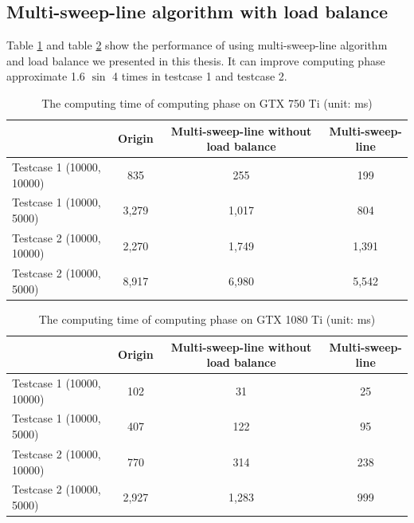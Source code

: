 \subsection{Multi-sweep-line algorithm with load balance}
Table \ref{table:5_13} and table \ref{table:5_14} show the performance of using multi-sweep-line algorithm and load balance we presented in this thesis. It can improve computing phase approximate 1.6 $\sin$ 4 times in testcase 1 and testcase 2.
\begin{table}[!h]
\centering
\begin{tabular}{| l | c | c | c |} 
 \hline
  & Origin  & Multi-sweep-line without load balance & Multi-sweep-line \\ [0.5ex] \hline
  Testcase 1 (10000, 10000) & 835 & 255 & 199\\ \hline
  Testcase 1 (10000, 5000) & 3,279 & 1,017 & 804\\ \hline
  Testcase 2 (10000, 10000) & 2,270 & 1,749 & 1,391\\ \hline
  Testcase 2 (10000, 5000) & 8,917 & 6,980 & 5,542\\ \hline
\end{tabular}
\caption{The computing time of computing phase on GTX 750 Ti (unit: ms)}
\label{table:5_13}
\end{table}

\begin{table}[!h]
\centering
\begin{tabular}{| l | c | c | c |} 
 \hline
  & Origin  & Multi-sweep-line without load balance & Multi-sweep-line \\ [0.5ex] \hline
  Testcase 1 (10000, 10000) & 102 & 31 & 25\\ \hline
  Testcase 1 (10000, 5000) & 407 & 122 & 95\\ \hline
  Testcase 2 (10000, 10000) & 770 & 314 & 238\\ \hline
  Testcase 2 (10000, 5000) & 2,927 & 1,283 & 999\\ \hline
\end{tabular}
\caption{The computing time of computing phase on GTX 1080 Ti (unit: ms)}
\label{table:5_14}
\end{table}

